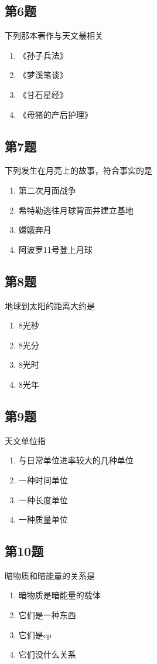 \documentclass[hyperref,UTF8]{ctexart}
\begin{document}
\subsection*{第6题} 
下列那本著作与天文最相关
\begin{enumerate}[\label= A.]
    \item 《孙子兵法》\item 《梦溪笔谈》\item 《甘石星经》\item 《母猪的产后护理》
\end{enumerate} 
\newpage
\subsection*{第7题}
下列发生在月亮上的故事，符合事实的是
\begin{enumerate}[\label= A.]
    \item 第二次月面战争\item 希特勒逃往月球背面并建立基地\item 嫦娥奔月\item 阿波罗11号登上月球
\end{enumerate} 

\subsection*{第8题} 
地球到太阳的距离大约是
\begin{enumerate}[\label= A.]
    \item 8光秒\item 8光分\item 8光时\item 8光年
\end{enumerate}

\subsection*{第9题} 
天文单位指
\begin{enumerate}[\label= A.]
    \item 与日常单位进率较大的几种单位\item 一种时间单位\item 一种长度单位\item 一种质量单位
\end{enumerate} 
\newpage 
\subsection*{第10题} 
暗物质和暗能量的关系是\begin{enumerate}[\label= A.]
    \item 暗物质是暗能量的载体\item 它们是一种东西\item 它们是cp \item 它们没什么关系
\end{enumerate} 
\end{document}
